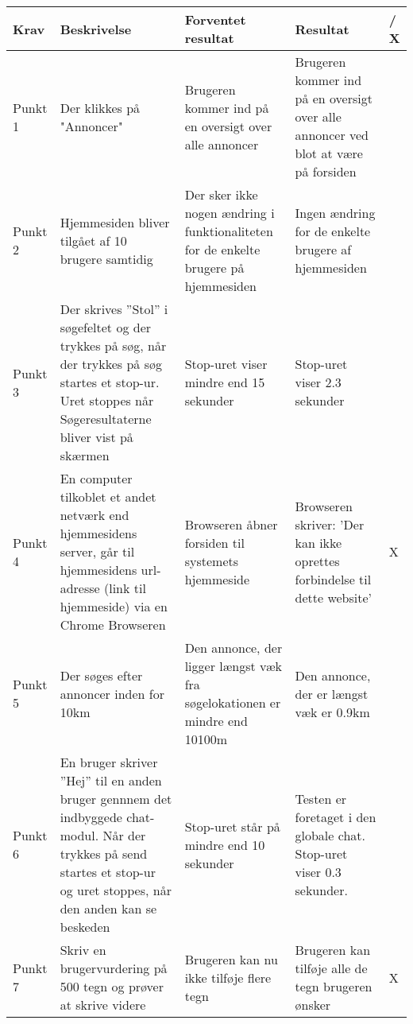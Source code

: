 \setlength{\arrayrulewidth}{0.3mm}
\setlength{\tabcolsep}{2pt}
\renewcommand{\arraystretch}{1.5}
\begin{table}[H]
	\begin{tabular}{ |p{1.4cm}|p{5.0cm}|p{5.0cm}|p{3.8cm}|p{1.0cm}| } 
		\hline
		\textbf{Krav} & \textbf{Beskrivelse} & \textbf{Forventet resultat} & \textbf{Resultat} & \textbf{\checkmark / X} \\
		\hline
		Punkt 1 & Der klikkes på "Annoncer"  & Brugeren kommer ind på en oversigt over alle annoncer & Brugeren kommer ind på en oversigt over alle annoncer ved blot at være på forsiden & \checkmark\\
		\hline
		Punkt 2 & Hjemmesiden bliver tilgået af 10 brugere samtidig & Der sker ikke nogen ændring i funktionaliteten for de enkelte brugere på hjemmesiden & Ingen ændring for de enkelte brugere af hjemmesiden & \checkmark \\
		\hline
		Punkt 3 & Der skrives ''Stol'' i søgefeltet og der trykkes på søg, når der trykkes på søg startes et stop-ur. Uret stoppes når Søgeresultaterne bliver vist på skærmen & Stop-uret viser mindre end 15 sekunder & Stop-uret viser 2.3 sekunder & \checkmark \\
		\hline
		Punkt 4 & En computer tilkoblet et andet netværk end hjemmesidens server, går til hjemmesidens url-adresse (link til hjemmeside) via en Chrome Browseren & Browseren åbner forsiden til systemets hjemmeside  & Browseren skriver: 'Der kan ikke oprettes forbindelse til dette website' & X \\
		\hline
		Punkt 5 & Der søges efter annoncer inden for 10km & Den annonce, der ligger længst væk fra søgelokationen er mindre end 10100m & Den annonce, der er længst væk er 0.9km & \checkmark \\
		\hline 
		Punkt 6 & En bruger skriver ''Hej'' til en anden bruger gennnem det indbyggede chat-modul. Når der trykkes på send startes et stop-ur og uret stoppes, når den anden kan se beskeden & Stop-uret står på mindre end 10 sekunder & Testen er foretaget i den globale chat. Stop-uret viser 0.3 sekunder. & \checkmark \\
		\hline
		Punkt 7 & Skriv en brugervurdering på 500 tegn og prøver at skrive videre & Brugeren kan nu ikke tilføje flere tegn & Brugeren kan tilføje alle de tegn brugeren ønsker & X\\

\end{tabular}
\end{table}

